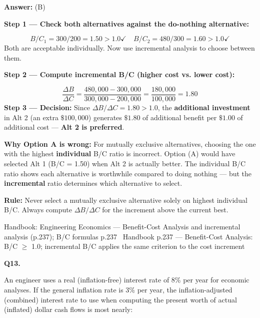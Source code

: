 \documentclass[11pt]{article}
\begin{document}
\vspace{2pt}\par\noindent\colorbox{boxbg}{\parbox{\dimexpr\linewidth-2\fboxsep\relax}{%
\vspace{2pt}\textbf{Answer:} (B)\par\vspace{2pt}
{\small \textbf{Step 1 --- Check both alternatives against the do-nothing alternative:}\par
\[B/C_1 = 300/200 = 1.50 > 1.0 \checkmark \quad B/C_2 = 480/300 = 1.60 > 1.0 \checkmark\]
Both are acceptable individually. Now use incremental analysis to choose between them.\par
\textbf{Step 2 --- Compute incremental B/C (higher cost vs. lower cost):}\par
\[\frac{\Delta B}{\Delta C} = \frac{480{,}000 - 300{,}000}{300{,}000 - 200{,}000} = \frac{180{,}000}{100{,}000} = 1.80\]
\textbf{Step 3 --- Decision:} Since $\Delta B/\Delta C = 1.80 > 1.0$, the \textbf{additional investment} in Alt 2 (an extra $\$100{,}000$) generates $\$1.80$ of additional benefit per $\$1.00$ of additional cost --- \textbf{Alt 2 is preferred}.\par
\textbf{Why Option A is wrong:} For mutually exclusive alternatives, choosing the one with the highest \textbf{individual} B/C ratio is incorrect. Option (A) would have selected Alt 1 (B/C = 1.50) when Alt 2 is actually better. The individual B/C ratio shows each alternative is worthwhile compared to doing nothing --- but the \textbf{incremental} ratio determines which alternative to select.\par
\textbf{Rule:} Never select a mutually exclusive alternative solely on highest individual B/C. Always compute $\Delta B/\Delta C$ for the increment above the current best.\par}\par\vspace{2pt}
{\footnotesize\color{soft}Handbook: Engineering Economics --- Benefit-Cost Analysis and incremental analysis (p.237); B/C formulas p.237 \textbullet\ Handbook p.237 --- Benefit-Cost Analysis: B/C $\ge$ 1.0; incremental B/C applies the same criterion to the cost increment}\vspace{2pt}
}}
\vspace{9pt}
\filbreak
\textbf{\color{accent}Q13.}\par\vspace{2pt}
An engineer uses a real (inflation-free) interest rate of 8\% per year for economic analyses. If the general inflation rate is 3\% per year, the inflation-adjusted (combined) interest rate to use when computing the present worth of actual (inflated) dollar cash flows is most nearly:\par\par\vspace{3pt}
\end{document}

